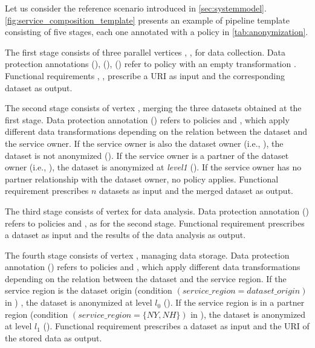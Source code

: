 \begin{example}[\bf \pipelineTemplate]\label{ex:template}
Let us consider the reference scenario introduced in \cref{sec:systemmodel}.
\cref{fig:service_composition_template} presents an example of pipeline template consisting of five stages, each one annotated with a policy in \cref{tab:anonymization}.

The first stage consists of three parallel vertices , ,  for data collection.
Data protection annotations \myLambda(), \myLambda(), \myLambda() refer to policy  with an empty transformation .
Functional requirements , ,   prescribe a URI as input and the corresponding dataset as output.

The second stage consists of vertex , merging the three datasets obtained at the first stage. Data protection annotation \myLambda() refers to policies  and , which apply different data transformations depending on the relation between the dataset and the service owner.
If the service owner is also the dataset owner (i.e., \pone), the dataset is not anonymized (). If the service owner is a partner of the dataset owner (i.e., \ptwo), the dataset is anonymized at \emph{level1} (). If the service owner has no partner relationship with the dataset owner, no policy applies.
Functional requirement  prescribes $n$ datasets as input and the merged dataset as output.

The third stage consists of vertex   for data analysis.
Data protection annotation \myLambda() refers to policies  and , as for the second stage.
Functional requirement  prescribes a dataset as input and the results of the data analysis as output.


The fourth stage consists of vertex , managing data storage. Data protection annotation \myLambda() refers to policies  and , which apply different data transformations depending on the relation between the dataset and the service region.
If the service region is the dataset origin (condition $(service\_region=dataset\_origin)$ in ) , the dataset is anonymized at level $l_0$ ().
If the service region is in a partner region (condition $(service\_region=\{NY,NH\})$ in ), the dataset is anonymized at level $l_1$ ().
Functional requirement  prescribes a dataset as input and the URI of the stored data as output.


\end{example}
